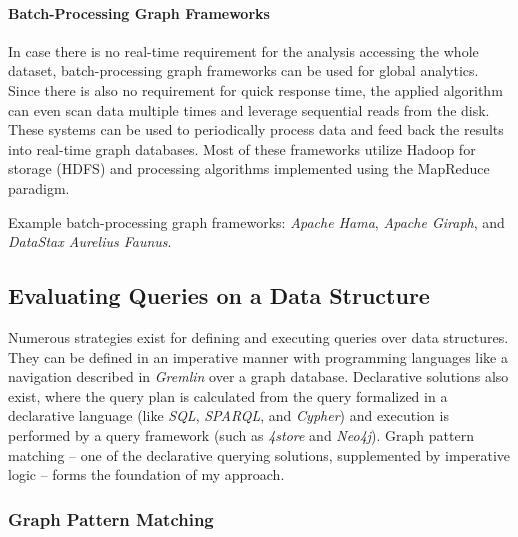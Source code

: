 \paragraph{Batch-Processing Graph Frameworks}
In case there is no real-time requirement for the analysis accessing the whole dataset, batch-processing graph frameworks can be used for global analytics. Since there is also no requirement for quick response time, the applied algorithm can even scan data multiple times and leverage sequential reads from the disk. These systems can be used to periodically process data and feed back the results into real-time graph databases. Most of these frameworks utilize Hadoop for storage (HDFS) and processing algorithms implemented using the MapReduce paradigm.

Example batch-processing graph frameworks: \emph{Apache Hama}, \emph{Apache Giraph}, and \emph{DataStax Aurelius Faunus}.

\subsection{Evaluating Queries on a Data Structure}
Numerous strategies exist for defining and executing queries over data structures. They can be defined in an imperative manner with programming languages like a navigation described in \emph{Gremlin} over a graph database. Declarative solutions also exist, where the query plan is calculated from the query formalized in a declarative language (like \emph{SQL}, \emph{SPARQL}, and \emph{Cypher}) and execution is performed by a query framework (such as \emph{4store} and \emph{Neo4j}). Graph pattern matching -- one of the declarative querying solutions, supplemented by imperative logic -- forms the foundation of my approach.

\subsubsection{Graph Pattern Matching}

